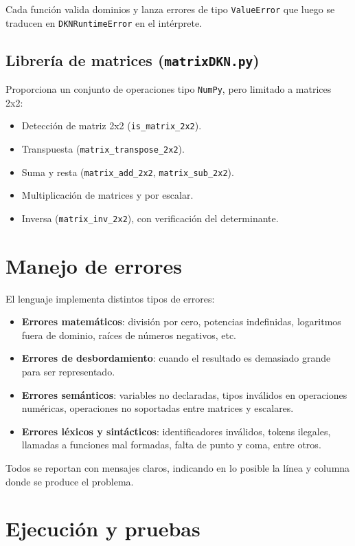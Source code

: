 \documentclass[stu, 12pt, letterpaper, donotrepeattitle, floatsintext, natbib]{apa7}
\begin{document}
Cada función valida dominios y lanza errores de tipo \texttt{ValueError} que luego se traducen en \texttt{DKNRuntimeError} en el intérprete.

\subsection{Librería de matrices (\texttt{matrixDKN.py})}
Proporciona un conjunto de operaciones tipo \texttt{NumPy}, pero limitado a matrices 2x2:
\begin{itemize}
  \item Detección de matriz 2x2 (\texttt{is\_matrix\_2x2}).
  \item Transpuesta (\texttt{matrix\_transpose\_2x2}).
  \item Suma y resta (\texttt{matrix\_add\_2x2}, \texttt{matrix\_sub\_2x2}).
  \item Multiplicación de matrices y por escalar.
  \item Inversa (\texttt{matrix\_inv\_2x2}), con verificación del determinante.
\end{itemize}

\section{\large Manejo de errores}

El lenguaje implementa distintos tipos de errores:

\begin{itemize}
  \item \textbf{Errores matemáticos}: división por cero, potencias indefinidas, logaritmos fuera de dominio, raíces de números negativos, etc.
  \item \textbf{Errores de desbordamiento}: cuando el resultado es demasiado grande para ser representado.
  \item \textbf{Errores semánticos}: variables no declaradas, tipos inválidos en operaciones numéricas, operaciones no soportadas entre matrices y escalares.
  \item \textbf{Errores léxicos y sintácticos}: identificadores inválidos, tokens ilegales, llamadas a funciones mal formadas, falta de punto y coma, entre otros.
\end{itemize}

Todos se reportan con mensajes claros, indicando en lo posible la línea y columna donde se produce el problema.

\section{\large Ejecución y pruebas}
\end{document}
